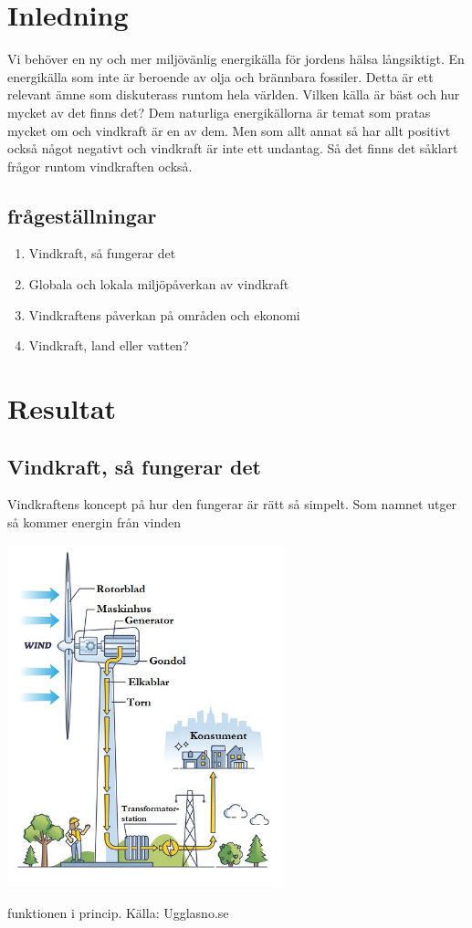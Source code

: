 \documentclass[11p]{article}
\begin{document}
    \section{Inledning}
    Vi behöver en ny och mer miljövänlig energikälla för jordens hälsa långsiktigt.
    En energikälla som inte är  beroende av olja och brännbara fossiler.
    Detta är ett relevant ämne som diskuterass runtom hela världen.
    Vilken källa är bäst och hur mycket av det finns det?
    Dem naturliga energikällorna är temat som pratas mycket om och vindkraft är en av dem.
    Men som allt annat så har allt positivt också något negativt och vindkraft är inte ett undantag.
    Så det finns det såklart frågor runtom vindkraften också.
    \subsection{frågeställningar}
    \begin{enumerate}
        \item Vindkraft, så fungerar det
        \item Globala och lokala miljöpåverkan av vindkraft
        \item Vindkraftens påverkan på områden och ekonomi
        \item Vindkraft, land eller vatten?
    \end{enumerate}

    \section{Resultat}

    \subsection{Vindkraft, så fungerar det}

    Vindkraftens koncept på hur den fungerar är rätt så simpelt.
    Som namnet utger så kommer energin från vinden

    \includegraphics[width=0.6\textwidth]{../images/vindhur.jpg}
    \caption{funktionen i princip. Källa: Ugglasno.se}
\end{document}
